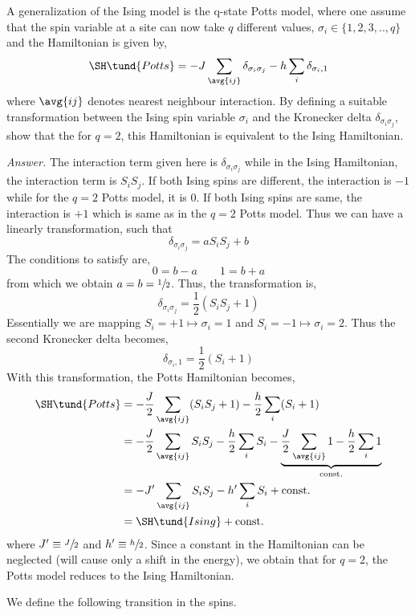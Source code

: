 \begin{question}
A generalization of the Ising model is the q-state Potts model, where one assume that the spin variable at a site can now take $q$ different values, $\sigma_i \in \{1, 2, 3, .., q\}$ and the Hamiltonian is given by,
$$\SH\tund{Potts} = -J \sum\limits_{\avg{ij}}\delta_{\sigma_i \sigma_j} - h\sum\limits_i \delta_{\sigma_i,1}$$
where $\avg{ij}$ denotes nearest neighbour interaction. By defining a suitable transformation between
the Ising spin variable $\sigma_i$ and the Kronecker delta $\delta_{\sigma_i\sigma_j}$, show that the for $q=2$, this Hamiltonian is equivalent to the Ising Hamiltonian.
\end{question}
\noindent
\textit{Answer.} The interaction term given here is $\delta_{\sigma_i\sigma_j}$ while in the Ising Hamiltonian, the interaction term is $S_iS_j$. If both Ising spins are different, the interaction is $-1$ while for the $q=2$ Potts model, it is $0$. If both Ising spins are same, the interaction is $+1$ which is same as in the $q=2$ Potts model. Thus we can have a linearly transformation, such that 
$$\delta_{\sigma_i \sigma_j} = a S_iS_j + b$$
The conditions to satisfy are,
$$0 = b-a\qquad 1 = b+a$$
from which we obtain $a=b=\sfrac{1}{2}$. Thus, the transformation is, 
$$\delta_{\sigma_i \sigma_j} =  \frac{1}{2}(S_iS_j + 1)$$
Essentially we are mapping $S_i = +1 \mapsto \sigma_i = 1$ and $S_i = -1 \mapsto \sigma_i = 2$. Thus the second Kronecker delta becomes, 
$$\delta_{\sigma_i,1} = \frac{1}{2}(S_i +1)$$
With this transformation, the Potts Hamiltonian becomes, 
\begin{align}
   \begin{split}
     \SH\tund{Potts} &= -\frac{J}{2} \sum\limits_{\avg{ij}} (S_iS_j+1) - \frac{h}{2}\sum\limits_i (S_i +1)\\
    &= -\frac{J}{2} \sum\limits_{\avg{ij}} S_iS_j - \frac{h}{2}\sum\limits_i S_i -\underbrace{\frac{J}{2}\sum\limits_{\avg{ij}}1 - \frac{h}{2}\sum\limits_{i} 1}_{\mathrm{const.}}\\
    &=-J'\sum\limits_{\avg{ij}} S_iS_j - h'\sum\limits_i S_i +\mathrm{const.}\\
    &=\SH\tund{Ising}+\mathrm{const.}
   \end{split}
\end{align}
where $J'\equiv \sfrac{J}{2}$ and $h'\equiv \sfrac{h}{2}$. Since a constant in the Hamiltonian can be neglected (will cause only a shift in the energy), we obtain that for $q=2$, the Potts model reduces to the Ising Hamiltonian.

We define the following transition in the spins.